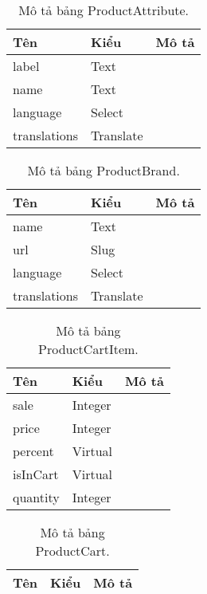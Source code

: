\begin{table}[p]
\begin{center}
\begin{tabular}{ |l|l|l| } 
	\hline
	Tên & Kiểu & Mô tả \\
	\hline
	label & Text & \dotfill \\
name & Text & \dotfill \\
language & Select & \dotfill \\
translations & Translate & \dotfill \\ 
	\hline
\end{tabular}
	\caption{Mô tả bảng ProductAttribute.}
	\label{table:ProductAttribute}
\end{center}
\end{table}


\begin{table}[p]
\begin{center}
\begin{tabular}{ |l|l|l| } 
	\hline
	Tên & Kiểu & Mô tả \\
	\hline
	name & Text & \dotfill \\
url & Slug & \dotfill \\
language & Select & \dotfill \\
translations & Translate & \dotfill \\ 
	\hline
\end{tabular}
	\caption{Mô tả bảng ProductBrand.}
	\label{table:ProductBrand}
\end{center}
\end{table}


\begin{table}[p]
\begin{center}
\begin{tabular}{ |l|l|l| } 
	\hline
	Tên & Kiểu & Mô tả \\
	\hline
	sale & Integer & \dotfill \\
price & Integer & \dotfill \\
percent & Virtual & \dotfill \\
isInCart & Virtual & \dotfill \\
quantity & Integer & \dotfill \\ 
	\hline
\end{tabular}
	\caption{Mô tả bảng ProductCartItem.}
	\label{table:ProductCartItem}
\end{center}
\end{table}


\begin{table}[p]
\begin{center}
\begin{tabular}{ |l|l|l| } 
	\hline
	Tên & Kiểu & Mô tả \\
	\hline
	 
	\hline
\end{tabular}
	\caption{Mô tả bảng ProductCart.}
	\label{table:ProductCart}
\end{center}
\end{table}



